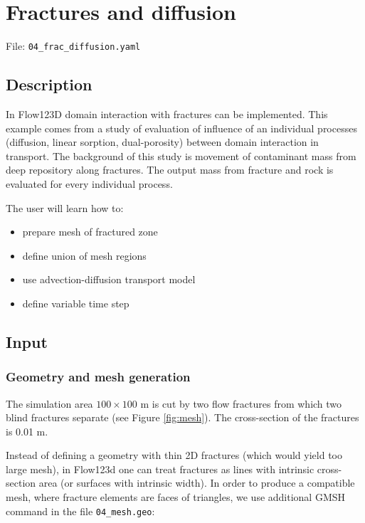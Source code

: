 \section{Fractures and diffusion}

File: \texttt{04\_frac\_diffusion.yaml}

\subsection{Description}

In Flow123D domain interaction with fractures can be implemented. This
example comes from a study of evaluation of influence of an individual
processes (diffusion, linear sorption, dual-porosity) between domain
interaction in transport. The background of this study is movement of
contaminant mass from deep repository along fractures. The output mass
from fracture and rock is evaluated for every individual process.

The user will learn how to:

\begin{itemize}
\tightlist
\item
  prepare mesh of fractured zone
\item
  define union of mesh regions
\item
  use advection-diffusion transport model
\item
  define variable time step
\end{itemize}

\subsection{Input}

\subsubsection{Geometry and mesh generation}

The simulation area \(100 \times 100\) m is cut by two flow fractures
from which two blind fractures separate (see Figure \ref{fig:mesh}). The
cross-section of the fractures is 0.01 m.

Instead of defining a geometry with thin 2D fractures (which would yield
too large mesh), in Flow123d one can treat fractures as lines with
intrinsic cross-section area (or surfaces with intrinsic width). In
order to produce a compatible mesh, where fracture elements are faces of
triangles, we use additional GMSH command in the file
\texttt{04\_mesh.geo}:

